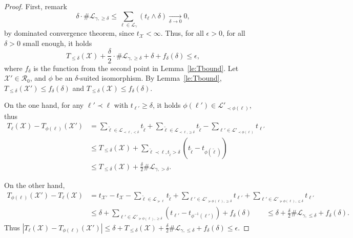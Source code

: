 \documentclass[11pt]{article}
\def\Conf{{\mathscr{R}}}
\begin{document}
\begin{proof}
  First, remark  \[ \delta\cdot \#   \mathcal{L}_{\gamma,\geq \delta} \leq \sum_{\ell\in \mathcal{L}_\gamma} (t_\ell \wedge \delta)\underset{\delta\to 0}\longrightarrow 0,\]
  by dominated convergence theorem, since $t_{\mathcal{X}}<\infty $. Thus, for all $\epsilon>0$, for all $\delta>0$ small enough, it holds
  \[T_{\leq\delta}(\mathcal{X})+ \frac{\delta}{2}\cdot \#   \mathcal{L}_{\gamma,\geq \delta} + \delta+f_\delta(\delta) \leq \epsilon,\] where $f_\delta$ is the function from the second point in Lemma~\ref{le:Tbound}.
  Let $\mathcal{X}'\in \Conf_0$, and  $\phi$ be an $\delta$-suited isomorphism. By Lemma~\ref{le:Tbound}, $T_{\leq\delta}(\mathcal{X}')\leq f_\delta(\delta)$ and $T_{\leq\delta}(\mathcal{X})\leq f_\delta(\delta)$.

  On the one hand, for any $\ell'\prec \ell$ with  $t_{\ell'}\geq \delta $, it holds $\phi(\ell')\in \mathcal{L}'_{\prec \phi(\ell)} $, thus
  \begin{align*}
  T_\ell(\mathcal{X})-T_{\phi(\ell)}(\mathcal{X}')&= \sum_{\tilde{\ell}\in \mathcal{L}_{\prec \ell,< \delta} } t_{\tilde{\ell}}
  + \sum_{\tilde{\ell}\in \mathcal{L}_{\prec \ell,\geq \delta} } t_{\tilde{\ell}}-
  \sum_{\ell'\in \mathcal{L}'_{\prec \phi(\ell)}   } t_{\ell'}\\
  &\leq T_{\leq \delta}(\mathcal{X})+  \sum_{\tilde{\ell}\prec \ell, t_{\tilde{\ell}}> \delta} (t_{\tilde{\ell}}-t_{\phi(\tilde{\ell})})\\
  & \leq T_{\leq \delta}(\mathcal{X})+ \frac{\delta}{2} \# \mathcal{L}_{\gamma,> \delta}.
  \end{align*}

  On the other hand,
  \begin{align*}
  T_{\phi(\ell)}(\mathcal{X}')-T_\ell(\mathcal{X}) &=
  t_{\mathcal{X}'}-t_{\mathcal{X}}-
  \sum_{\tilde{\ell}\in \mathcal{L}_{\succeq \ell} } t_{\tilde{\ell}}
  +\sum_{\ell'\in \mathcal{L}'_{\succeq \phi(\ell),\geq \delta}  } t_{\ell'}
  +
  \sum_{\ell'\in \mathcal{L}'_{\succeq \phi(\ell),\leq \delta}   } t_{\ell'}
  \\
  &\leq \delta +  \sum_{\ell'\in \mathcal{L}'_{\succeq \phi(\ell), \geq \delta} } (t_{\ell'}-t_{\phi^{-1}(\ell')})+f_\delta(\delta) \qquad \leq \delta + \frac{\delta}{2} \# \mathcal{L}_{\gamma,\leq \delta}+f_\delta(\delta).
  \end{align*}
  Thus $|T_\ell(\mathcal{X})-T_{\phi(\ell)}(\mathcal{X}')|\leq \delta +  T_{\leq \delta}(\mathcal{X})+ \frac{\delta}{2} \# \mathcal{L}_{\gamma,\leq \delta}+f_\delta(\delta)\leq
  \epsilon$.
\end{proof}
\end{document}
